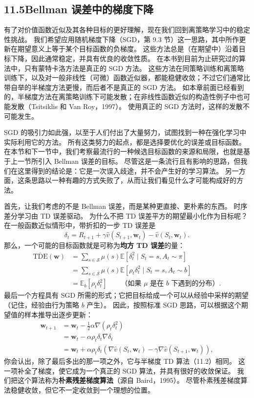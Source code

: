 \documentclass[UTF8, 12pt, fontset=fandol, oneside]{ctexart}
\begin{document}
\subsection*{11.5\quad Bellman 误差中的梯度下降}

有了对价值函数近似及其各种目标的更好理解，现在我们回到离策略学习中的稳定性挑战。
我们希望应用随机梯度下降（SGD，第 9.3 节）这一思路，其中所作更新在期望意义上等于某个目标函数的负梯度。
这些方法总是（在期望中）沿着目标下降，因此通常稳定，并具有优良的收敛性质。
在本书到目前为止研究过的算法中，只有蒙特卡洛方法是真正的 SGD 方法。
这些方法在同策略训练和离策略训练下，以及对一般非线性（可微）函数近似器，都能稳健收敛；不过它们通常比带自举的半梯度方法更慢，而后者不是真正的 SGD 方法。
如本章前面已经看到的，半梯度方法在离策略训练下可能发散；在非线性函数近似的构造性例子中也可能发散（Tsitsiklis 和 Van Roy，1997）。
使用真正的 SGD 方法时，这样的发散不可能发生。

SGD 的吸引力如此强，以至于人们付出了大量努力，试图找到一种在强化学习中实际利用它的方法。
所有这类努力的起点，都是选择要优化的误差或目标函数。
在本节和下一节中，我们考察最流行的一种候选目标函数的来源和局限，也就是基于上一节所引入 Bellman 误差的目标。
尽管这是一条流行且有影响的思路，但我们在这里得到的结论是：它是一次误入歧途，并不会产生好的学习算法。
另一方面，这条思路以一种有趣的方式失败了，从而让我们看见什么才可能构成好的方法。

首先，让我们考虑的不是 Bellman 误差，而是某种更直接、更朴素的东西。
时序差分学习由 TD 误差驱动。
为什么不把 TD 误差平方的期望最小化作为目标呢？
在一般函数近似情形中，带折扣的一步 TD 误差是
\[
\delta_t=R_{t+1}+\gamma\hat v(S_{t+1},\mathbf{w}_t)-\hat v(S_t,\mathbf{w}_t).
\]
那么，一个可能的目标函数就是可称为\textbf{均方 TD 误差}的量：
\[
\begin{aligned}
\overline{\mathrm{TDE}}(\mathbf{w})
&=\sum_{s\in\mathcal{S}}\mu(s)\mathbb{E}\left[\delta_t^2\mid S_t=s,A_t\sim\pi\right]\\
&=\sum_{s\in\mathcal{S}}\mu(s)\mathbb{E}\left[\rho_t\delta_t^2\mid S_t=s,A_t\sim b\right]\\
&=\mathbb{E}_b[\rho_t\delta_t^2]\qquad
\text{（如果 $\mu$ 是在 $b$ 下遇到的分布）}.
\end{aligned}
\]
最后一个方程具有 SGD 所需的形式；它把目标给成一个可以从经验中采样的期望（记住，经验由行为策略 $b$ 产生）。
因此，按照标准 SGD 思路，可以根据这个期望值的样本推导出逐步更新：
\begin{equation}
\begin{aligned}
\mathbf{w}_{t+1}
&=\mathbf{w}_t-\frac{1}{2}\alpha\nabla(\rho_t\delta_t^2)\\
&=\mathbf{w}_t-\alpha\rho_t\delta_t\nabla\delta_t\\
&=\mathbf{w}_t+\alpha\rho_t\delta_t\left(\nabla\hat v(S_t,\mathbf{w}_t)-\gamma\nabla\hat v(S_{t+1},\mathbf{w}_t)\right),
\end{aligned}
\tag{11.23}
\end{equation}
你会认出，除了最后多出的那一项之外，它与半梯度 TD 算法（11.2）相同。
这一项补全了梯度，使它成为一个真正的 SGD 算法，并具有很好的收敛保证。
我们把这个算法称为\textbf{朴素残差梯度算法}（源自 Baird，1995）。
尽管朴素残差梯度算法稳健收敛，但它不一定收敛到一个理想的位置。
\end{document}
